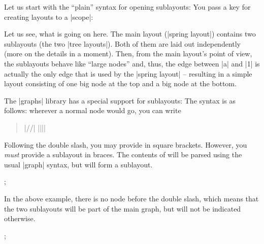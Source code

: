 Let us start with the ``plain'' syntax for opening sublayouts: You pass a key
for creating layouts to a |scope|:
%
\begin{codeexample}[preamble={\usetikzlibrary{graphs,graphdrawing}
\usegdlibrary{force,trees}}]
\end{codeexample}

Let us see, what is going on here. The main layout (|spring layout|) contains
two sublayouts (the two |tree layouts|). Both of them are laid out
independently (more on the details in a moment). Then, from the main layout's
point of view, the sublayouts behave like ``large nodes'' and, thus, the edge
between |a| and |1| is actually the only edge that is used by the
|spring layout| -- resulting in a simple layout consisting of one big node at
the top and a big node at the bottom.

The |graphs| library has a special support for sublayouts: The syntax is as
follows: wherever a normal node would go, you can write
%
\begin{quote}
    |//|  |{||}|
\end{quote}

Following the double slash, you may provide  in square
brackets. However, you \emph{must} provide a sublayout in braces. The contents
of  will be parsed using the usual |graph| syntax, but will
form a sublayout.
%
\begin{codeexample}[preamble={\usetikzlibrary{graphs,graphdrawing}
\usegdlibrary{force,trees}}]
\tikz {};
\end{codeexample}

In the above example, there is no node before the double slash, which means
that the two sublayouts will be part of the main graph, but will not be
indicated otherwise.
%
\begin{codeexample}[preamble={\usetikzlibrary{graphs,graphdrawing}
\usegdlibrary{circular,trees}}]
\tikz {};
\end{codeexample}

